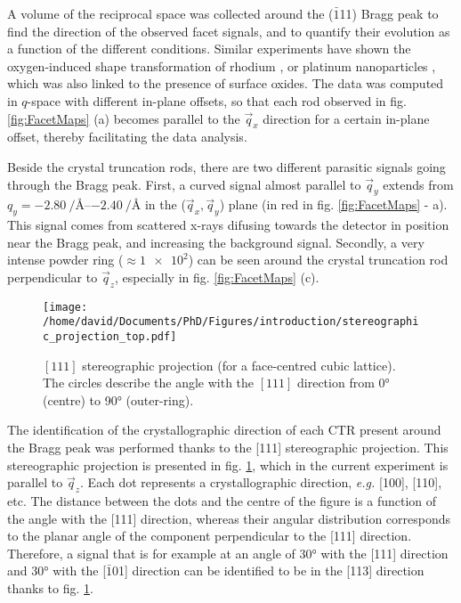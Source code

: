 A volume of the reciprocal space was collected around the ($\bar{1}$11) Bragg peak to find the direction of the observed facet signals, and to quantify their evolution as a function of the different conditions.
Similar experiments have shown the oxygen-induced shape transformation of rhodium \parencite{Nolte2008}, or platinum nanoparticles \parencite{Hejral2013}, which was also linked to the presence of surface oxides.
The data was computed in $q$-space with different in-plane offsets, so that each rod observed in fig. \ref{fig:FacetMaps} (a) becomes parallel to the $\vec{q}_x$ direction for a certain in-plane offset, thereby facilitating the data analysis.

Beside the crystal truncation rods, there are two different parasitic signals going through the Bragg peak.
First, a curved signal almost parallel to $\vec{q}_y$ extends from $q_y = \qtyrange{-2.80}{-2.40}{\per\angstrom}$ in the ($\vec{q}_x, \vec{q}_y$) plane (in red in fig. \ref{fig:FacetMaps} - a).
This signal comes from scattered x-rays difusing towards the detector in position near the Bragg peak, and increasing the background signal.
Secondly, a very intense powder ring ($\approx \num{1e2}$) can be seen around the crystal truncation rod perpendicular to $\vec{q}_z$, especially in fig. \ref{fig:FacetMaps} (c).

\begin{figure}[!htb]
    \centering
    \texttt{[image: /home/david/Documents/PhD/Figures/introduction/stereographic\_projection\_top.pdf]}
    \caption{
        $[111]$ stereographic projection (for a face-centred cubic lattice).
        The circles describe the angle with the $[111]$ direction from \ang{0} (centre) to \ang{90} (outer-ring).
    }
    \label{fig:StereoTop}
\end{figure}

The identification of the crystallographic direction of each CTR present around the Bragg peak was performed thanks to the [111] stereographic projection.
This stereographic projection is presented in fig. \ref{fig:StereoTop}, which in the current experiment is parallel to $\vec{q}_z$.
Each dot represents a crystallographic direction, \textit{e.g.} [100], [110], etc.
The distance between the dots and the centre of the figure is a function of the angle with the [111] direction, whereas their angular distribution corresponds to the planar angle of the component perpendicular to the [111] direction.
Therefore, a signal that is for example at an angle of \ang{30} with the [111] direction and \ang{30} with the [$\bar{1}$01] direction can be identified to be in the [113] direction thanks to fig. \ref{fig:StereoTop}.

